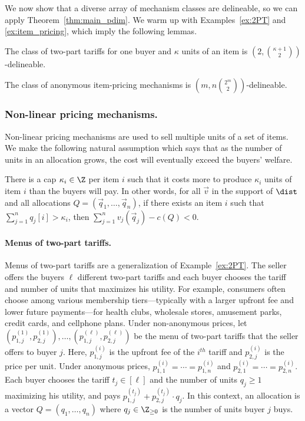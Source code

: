We now show that a diverse array of mechanism classes are delineable, so we can apply Theorem~\ref{thm:main_pdim}.
We warm up with Examples~\ref{ex:2PT} and \ref{ex:item_pricing}, which imply the following lemmas.

\begin{lemma}\label{lem:easy2part}
The class of two-part tariffs for one buyer and $\kappa$ units of an item is $\left(2,{\kappa + 1 \choose 2}\right)$-delineable.
\end{lemma}


\begin{lemma}
The class of anonymous item-pricing mechanisms is $\left(m, n{2^m \choose 2}\right)$-delineable.
\end{lemma}

\subsubsection{Non-linear pricing mechanisms.}\label{sec:non_linear}
Non-linear pricing mechanisms are used to sell multiple units of a set of items. We make the following natural assumption which says that as the number of units in an allocation grows, the cost will eventually exceed the buyers' welfare. 
\begin{assumption}\label{assumption:unit_cap}
There is a cap $\kappa_i \in \Z$ per item $i$ such that it costs more to produce $\kappa_i$ units of item $i$ than the buyers will pay.
In other words, for all $\vec{v}$ in the support of $\dist$ and all allocations $Q = \left(\vec{q}_1, \dots, \vec{q}_n\right)$, if there exists an item $i$ such that $\sum_{j = 1}^n q_j[i] > \kappa_i$, then $\sum_{j = 1}^n v_j\left(\vec{q}_j\right) - c\left(Q\right) < 0$.
\end{assumption}



\paragraph{Menus of two-part tariffs.} Menus of two-part tariffs are a generalization of Example~\ref{ex:2PT}. The seller offers the buyers $\ell$ different two-part tariffs and each buyer chooses the tariff and number of units that maximizes his utility. For example, consumers often choose among various membership tiers---typically with a larger upfront fee and lower future payments---for health clubs,  wholesale  stores,  amusement  parks, credit cards, and cellphone plans.
Under non-anonymous prices, let $\left(p_{1, j}^{(1)}, p_{2, j}^{(1)}\right), \dots, \left(p_{1, j}^{(\ell)}, p_{2, j}^{(\ell)}\right)$ be the menu of two-part tariffs that the seller offers to buyer $j$. Here, $p_{1,j}^{(i)}$ is the upfront fee of the $i^{th}$ tariff and $p_{2,j}^{(i)}$ is the price per unit. Under anonymous prices, $p_{1,1}^{(i)} = \cdots = p_{1,n}^{(i)}$ and $p_{2,1}^{(i)} = \cdots = p_{2,n}^{(i)}$. Each buyer  chooses the tariff $t_j \in [\ell]$ and the number of units $q_j \geq 1$ maximizing his utility, and pays $p_{1,j}^{(t_j)} + p_{2,j}^{(t_j)} \cdot q_j$. In this context, an allocation is  a vector $Q = \left(q_1, \dots, q_n\right)$ where $q_j \in \Z_{\geq 0}$ is the number of units buyer $j$ buys.

